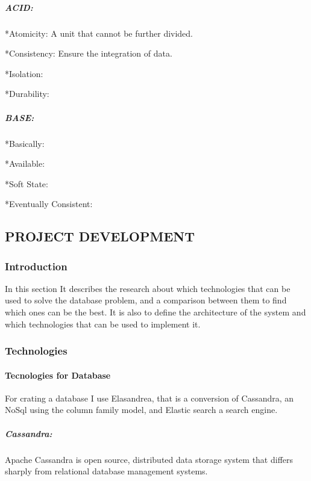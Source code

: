 \documentclass[]{article}
\let\oldparagraph\paragraph
\renewcommand{\paragraph}[1]{\oldparagraph{#1}\mbox{}}
\let\oldsubparagraph\subparagraph
\renewcommand{\subparagraph}[1]{\oldsubparagraph{#1}\mbox{}}
\begin{document}
\hypertarget{acid}{%
\subparagraph{ACID:}\label{acid}}

*Atomicity: A unit that cannot be further divided.

*Consistency: Ensure the integration of data.

*Isolation:

*Durability:

\hypertarget{base}{%
\subparagraph{BASE:}\label{base}}

*Basically:

*Available:

*Soft State:

*Eventually Consistent:

\hypertarget{project-development}{%
\subsection{PROJECT DEVELOPMENT}\label{project-development}}

\hypertarget{introduction-1}{%
\subsubsection{Introduction}\label{introduction-1}}

In this section It describes the research about which technologies that
can be used to solve the database problem, and a comparison between them
to find which ones can be the best. It is also to define the
architecture of the system and which technologies that can be used to
implement it.

\hypertarget{technologies}{%
\subsubsection{Technologies}\label{technologies}}

\hypertarget{tecnologies-for-database}{%
\paragraph{Tecnologies for Database}\label{tecnologies-for-database}}

For crating a database I use Elasandrea, that is a conversion of
Cassandra, an NoSql using the column family model, and Elastic search a
search engine.

\hypertarget{cassandra}{%
\subparagraph{Cassandra:}\label{cassandra}}

Apache Cassandra is open source, distributed data storage system that
differs sharply from relational database management systems.
\end{document}

